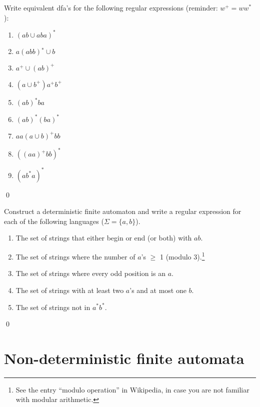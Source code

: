 \documentclass[11pt]{article}
\begin{document}
{\begin{uexercise}
Write equivalent dfa's for the following regular expressions (reminder: $w^+=ww^*$):
\begin{enumerate}
\item
$(ab \cup aba)^*$
\item
$a(abb)^∗ \cup b$
\item
$a^+ \cup (ab)^+$
\item
$(a \cup b^+)a^+b^+$
\item
$(ab)^*ba$
\item
$(ab)^*(ba)^*$
\item
$aa(a \cup b)^+bb$
\item
$((aa)^+bb)^*$
\item
$(ab^*a)^*$
\end{enumerate}

\qed
\end{uexercise}

\begin{uexercise}
Construct a deterministic finite automaton and write a regular expression for each of the following languages
($\Sigma=\{a,b\}$).
\begin{enumerate}
\item The set of strings that either begin or end (or both) with $ab$.
\item The set of strings where the number of $a$'s $\geq$ 1 (modulo 3).\footnote{See
the entry ``modulo operation'' in Wikipedia, in case you are not familiar with
modular arithmetic.}
\item The set of strings where every odd position is an $a$.
\item The set of strings with at least two $a$'s and at most one $b$.
\item The set of strings not in $a^*b^*$.
\end{enumerate}

\qed
\end{uexercise}
\hrulefill



}

\section{Non-deterministic finite automata}
\end{document}
